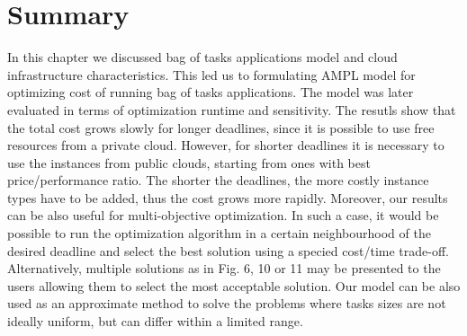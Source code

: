 {\section{Summary}

  In this chapter we discussed bag of tasks applications model and cloud infrastructure characteristics. This led us to formulating AMPL model for optimizing cost of running bag of tasks applications. The model was later evaluated in terms of optimization runtime and sensitivity. The resutls show that the total cost grows slowly for longer deadlines, since it is possible to use free resources from a private cloud. However, for shorter deadlines it is necessary to use the instances from public clouds, starting from ones with best price/performance ratio. The shorter the deadlines, the more costly instance types have to be added, thus the cost grows more rapidly. Moreover, our results can be also useful for multi-objective optimization. In such a case, it would be possible to run the optimization algorithm in a certain neighbourhood of the desired deadline and select the best solution using a specied cost/time trade-off. Alternatively, multiple solutions as in Fig. 6, 10 or 11 may be presented to the users allowing them to select the most acceptable solution. Our model can be also used as an approximate method to solve the problems where tasks sizes are not ideally uniform, but can differ within a limited range.
	
} %
